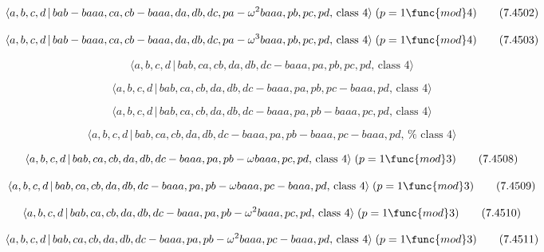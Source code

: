 \documentclass[10pt]{article}
\begin{document}
\begin{equation}
\langle a,b,c,d\,|\,bab-baaa,ca,cb-baaa,da,db,dc,pa-\omega
^{2}baaa,pb,pc,pd,\,\text{class }4\rangle \;(p=1\func{mod}4)  \tag{7.4502}
\end{equation}

\begin{equation}
\langle a,b,c,d\,|\,bab-baaa,ca,cb-baaa,da,db,dc,pa-\omega
^{3}baaa,pb,pc,pd,\,\text{class }4\rangle \;(p=1\func{mod}4)  \tag{7.4503}
\end{equation}

\begin{equation}
\langle a,b,c,d\,|\,bab,ca,cb,da,db,dc-baaa,pa,pb,pc,pd,\,\text{class }%
4\rangle  \tag{7.4504}
\end{equation}

\begin{equation}
\langle a,b,c,d\,|\,bab,ca,cb,da,db,dc-baaa,pa,pb,pc-baaa,pd,\,\text{class }%
4\rangle  \tag{7.4505}
\end{equation}

\begin{equation}
\langle a,b,c,d\,|\,bab,ca,cb,da,db,dc-baaa,pa,pb-baaa,pc,pd,\,\text{class }%
4\rangle  \tag{7.4506}
\end{equation}

\begin{equation}
\langle a,b,c,d\,|\,bab,ca,cb,da,db,dc-baaa,pa,pb-baaa,pc-baaa,pd,\,\text{%
class }4\rangle  \tag{7.4507}
\end{equation}

\begin{equation}
\langle a,b,c,d\,|\,bab,ca,cb,da,db,dc-baaa,pa,pb-\omega baaa,pc,pd,\,\text{%
class }4\rangle \;(p=1\func{mod}3)  \tag{7.4508}
\end{equation}

\begin{equation}
\langle a,b,c,d\,|\,bab,ca,cb,da,db,dc-baaa,pa,pb-\omega baaa,pc-baaa,pd,\,%
\text{class }4\rangle \;(p=1\func{mod}3)  \tag{7.4509}
\end{equation}

\begin{equation}
\langle a,b,c,d\,|\,bab,ca,cb,da,db,dc-baaa,pa,pb-\omega ^{2}baaa,pc,pd,\,%
\text{class }4\rangle \;(p=1\func{mod}3)  \tag{7.4510}
\end{equation}

\begin{equation}
\langle a,b,c,d\,|\,bab,ca,cb,da,db,dc-baaa,pa,pb-\omega
^{2}baaa,pc-baaa,pd,\,\text{class }4\rangle \;(p=1\func{mod}3)  \tag{7.4511}
\end{equation}
\end{document}
